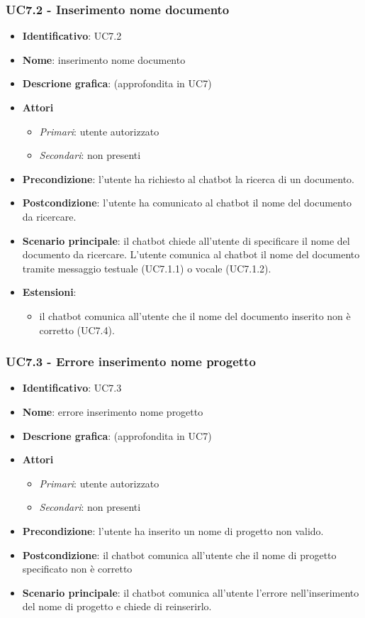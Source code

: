 \subsubsection{UC7.2 - Inserimento nome documento}
\begin{itemize}
    \item \textbf{Identificativo}: UC7.2
    \item \textbf{Nome}: inserimento nome documento
    \item \textbf{Descrione grafica}: (approfondita in UC7)
    \item \textbf{Attori}
 \begin{itemize} 
    \item \textit{Primari}: utente autorizzato
    \item \textit{Secondari}: non presenti
 \end{itemize}
 \item \textbf{Precondizione}: l'utente ha richiesto al chatbot la ricerca di un documento.
 \item \textbf{Postcondizione}:  l'utente ha comunicato al chatbot il nome del documento da ricercare.
 \item \textbf{Scenario principale}: il chatbot chiede all'utente di specificare il nome del documento da ricercare. L'utente comunica al chatbot il nome del documento tramite messaggio testuale (UC7.1.1) o vocale (UC7.1.2).
 \item \textbf{Estensioni}: 
\begin{itemize} 
    \item il chatbot comunica all'utente che il nome del documento inserito non è corretto (UC7.4).
 \end{itemize}
\end{itemize}
\subsubsection{UC7.3 - Errore inserimento nome progetto}
\begin{itemize}
    \item \textbf{Identificativo}: UC7.3
    \item \textbf{Nome}: errore inserimento nome progetto
    \item \textbf{Descrione grafica}: (approfondita in UC7)
    \item \textbf{Attori}
 \begin{itemize} 
    \item \textit{Primari}: utente autorizzato
    \item \textit{Secondari}: non presenti
 \end{itemize}
 \item \textbf{Precondizione}: l'utente ha inserito un nome di progetto non valido.
 \item \textbf{Postcondizione}:  il chatbot comunica all'utente che il nome di progetto specificato non è corretto
 \item \textbf{Scenario principale}: il chatbot comunica all'utente l'errore nell'inserimento del nome di progetto e chiede di reinserirlo.
\end{itemize}
